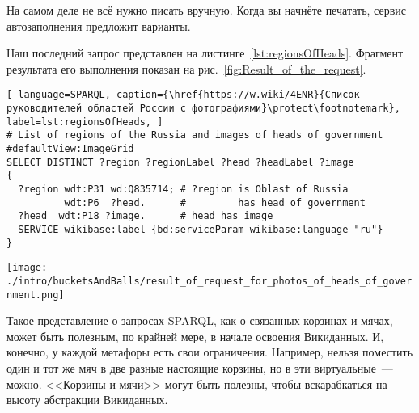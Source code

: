 На самом деле не всё нужно писать вручную. Когда вы начнёте печатать, сервис автозаполнения предложит варианты.

Наш последний запрос представлен на листинге~\ref{lst:regionsOfHeads}. Фрагмент результата его выполнения показан на рис.~\ref{fig:Result_of_the_request}.

\lstset{numbers=left, firstnumber=1, frame=single}
\begin{lstlisting}[ language=SPARQL, caption={\href{https://w.wiki/4ENR}{Список руководителей областей России с фотографиями}\protect\footnotemark}, label=lst:regionsOfHeads, ]
# List of regions of the Russia and images of heads of government
#defaultView:ImageGrid
SELECT DISTINCT ?region ?regionLabel ?head ?headLabel ?image
{
  ?region wdt:P31 wd:Q835714; # ?region is Oblast of Russia
          wdt:P6  ?head.      #         has head of government
  ?head  wdt:P18 ?image.      # head has image
  SERVICE wikibase:label {bd:serviceParam wikibase:language "ru"} 
}
\end{lstlisting}


\begin{figure*}[h!]
\texttt{[image: ./intro/bucketsAndBalls/result\_of\_request\_for\_photos\_of\_heads\_of\_government.png]}
\caption{Результат запроса в виде сетки изображений.}
\label{fig:Result_of_the_request}
\end{figure*}


Такое представление о запросах SPARQL, как о связанных корзинах и мячах, может быть полезным, по крайней мере, в начале освоения Викиданных. И, конечно, у каждой метафоры есть свои ограничения. Например, нельзя поместить один и тот же мяч в две разные настоящие корзины, но в эти виртуальные~--- можно. <<Корзины и мячи>> могут быть полезны, чтобы вскарабкаться на высоту абстракции Викиданных.
